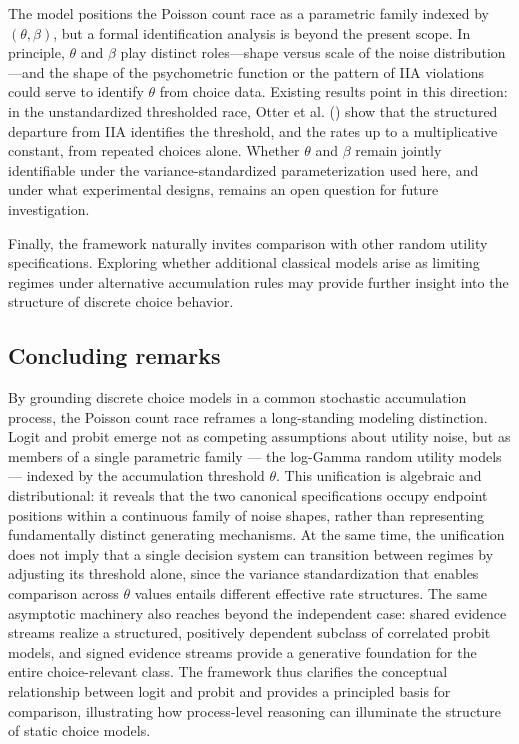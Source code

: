 \documentclass[
  man,
  floatsintext,
  longtable,
  a4paper,
  nolmodern,
  notxfonts,
  notimes,
  colorlinks=true,linkcolor=blue,citecolor=blue,urlcolor=blue]{apa7}
\begin{document}
The model positions the Poisson count race as a parametric family
indexed by \((\theta, \beta)\), but a formal identification analysis is
beyond the present scope. In principle, \(\theta\) and \(\beta\) play
distinct roles---shape versus scale of the noise distribution---and the
shape of the psychometric function or the pattern of IIA violations
could serve to identify \(\theta\) from choice data. Existing results
point in this direction: in the unstandardized thresholded race, Otter
et al. () show that
the structured departure from IIA identifies the threshold, and the
rates up to a multiplicative constant, from repeated choices alone.
Whether \(\theta\) and \(\beta\) remain jointly identifiable under the
variance-standardized parameterization used here, and under what
experimental designs, remains an open question for future investigation.

Finally, the framework naturally invites comparison with other random
utility specifications. Exploring whether additional classical models
arise as limiting regimes under alternative accumulation rules may
provide further insight into the structure of discrete choice behavior.

\subsection{Concluding remarks}\label{concluding-remarks}

By grounding discrete choice models in a common stochastic accumulation
process, the Poisson count race reframes a long-standing modeling
distinction. Logit and probit emerge not as competing assumptions about
utility noise, but as members of a single parametric family --- the
log-Gamma random utility models --- indexed by the accumulation
threshold \(\theta\). This unification is algebraic and distributional:
it reveals that the two canonical specifications occupy endpoint
positions within a continuous family of noise shapes, rather than
representing fundamentally distinct generating mechanisms. At the same
time, the unification does not imply that a single decision system can
transition between regimes by adjusting its threshold alone, since the
variance standardization that enables comparison across \(\theta\)
values entails different effective rate structures. The same asymptotic
machinery also reaches beyond the independent case: shared evidence
streams realize a structured, positively dependent subclass of
correlated probit models, and signed evidence streams provide a
generative foundation for the entire choice-relevant class. The
framework thus clarifies the conceptual relationship between logit and
probit and provides a principled basis for comparison, illustrating how
process-level reasoning can illuminate the structure of static choice
models.
\end{document}
